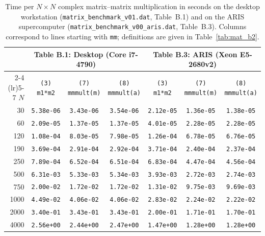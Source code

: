 \begin{table}[htbp]
\centering
\scriptsize
\setlength{\tabcolsep}{4pt}
\begin{tabular}{r c c c @{\hspace{1.2em}} c c c}
\toprule
 & \multicolumn{3}{c}{\textbf{Table B.1: Desktop (Core i7-4790)}} & \multicolumn{3}{c}{\textbf{Table B.3: ARIS (Xeon E5-2680v2)}} \\
\cmidrule(lr){2-4} \cmidrule(lr){5-7}
$N$ & \texttt{(3) m1*m2} & \texttt{(7) mmmult(m)} & \texttt{(8) mmmult(a)} & \texttt{(3) m1*m2} & \texttt{(7) mmmult(m)} & \texttt{(8) mmmult(a)} \\
\midrule
30   & \texttt{5.38e-06} & \texttt{3.43e-06} & \texttt{3.54e-06} & \texttt{2.12e-05} & \texttt{1.36e-05} & \texttt{1.38e-05} \\
60   & \texttt{2.09e-05} & \texttt{1.37e-05} & \texttt{1.37e-05} & \texttt{4.01e-05} & \texttt{2.28e-05} & \texttt{2.28e-05} \\
120  & \texttt{1.08e-04} & \texttt{8.03e-05} & \texttt{7.98e-05} & \texttt{1.26e-04} & \texttt{6.78e-05} & \texttt{6.76e-05} \\
190  & \texttt{3.69e-04} & \texttt{2.91e-04} & \texttt{2.92e-04} & \texttt{3.71e-04} & \texttt{2.40e-04} & \texttt{2.37e-04} \\
250  & \texttt{7.89e-04} & \texttt{6.52e-04} & \texttt{6.51e-04} & \texttt{6.83e-04} & \texttt{4.47e-04} & \texttt{4.56e-04} \\
500  & \texttt{6.31e-03} & \texttt{5.33e-03} & \texttt{5.34e-03} & \texttt{3.93e-03} & \texttt{2.72e-03} & \texttt{2.74e-03} \\
750  & \texttt{2.00e-02} & \texttt{1.72e-02} & \texttt{1.72e-02} & \texttt{1.31e-02} & \texttt{9.75e-03} & \texttt{9.69e-03} \\
1000 & \texttt{4.49e-02} & \texttt{4.06e-02} & \texttt{4.06e-02} & \texttt{2.83e-02} & \texttt{2.24e-02} & \texttt{2.22e-02} \\
2000 & \texttt{3.40e-01} & \texttt{3.43e-01} & \texttt{3.43e-01} & \texttt{2.00e-01} & \texttt{1.71e-01} & \texttt{1.70e-01} \\
4000 & \texttt{2.56e+00} & \texttt{2.44e+00} & \texttt{2.47e+00} & \texttt{1.47e+00} & \texttt{1.28e+00} & \texttt{1.28e+00} \\
\bottomrule
\end{tabular}
\caption{\label{tab:mat_b1}\label{tab:mat_b3}Time per $N\times N$ complex matrix--matrix multiplication in seconds on the desktop workstation (\texttt{matrix\_benchmark\_v01.dat}, Table~B.1) and on the ARIS supercomputer (\texttt{matrix\_benchmark\_v00\_aris.dat}, Table~B.3). Columns correspond to lines starting with \texttt{mm}; definitions are given in Table~\ref{tab:mat_b2}.}
\end{table}

